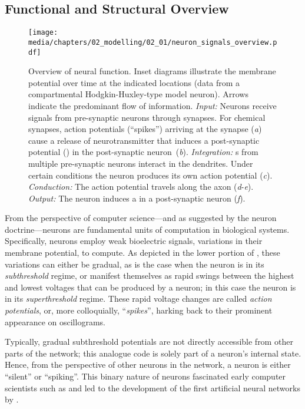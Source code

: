 \subsection{Functional and Structural Overview}
\label{sec:neurons_overview}

\begin{figure}
	\centering
	\texttt{[image: media/chapters/02\_modelling/02\_01/neuron\_signals\_overview.pdf]}
	\caption[Overview of neural function]{Overview of neural function. Inset diagrams illustrate the membrane potential over time at the indicated locations (data from a compartmental Hodgkin-Huxley-type model neuron). Arrows indicate the predominant flow of information. \emph{Input:} Neurons receive signals from pre-synaptic neurons through synapses. For chemical synapses, action potentials (\enquote{spikes}) arriving at the synapse (\emph{a}) cause a release of neurotransmitter that induces a post-synaptic potential (\PSP) in the post-synaptic neuron~(\emph{b}). \emph{Integration:} {\PSP}s from multiple pre-synaptic neurons interact in the dendrites. Under certain conditions the neuron produces its own action potential (\emph{c}). \emph{Conduction:} The action potential travels along the axon (\emph{d}-\emph{e}). \emph{Output:} The neuron induces a \PSP in a post-synaptic neuron (\emph{f}).
	}
	\label{fig:neuron_signal_overview}
\end{figure}

From the perspective of computer science---and as suggested by the neuron doctrine---neurons are fundamental units of computation in biological systems.
Specifically, neurons employ weak bioelectric signals, variations in their membrane potential, to compute.
As depicted in the lower portion of , these variations can either be gradual, as is the case when the neuron is in its \emph{subthreshold} regime, or manifest themselves as rapid swings between the highest and lowest voltages that can be produced by a neuron; in this case the neuron is in its \emph{superthreshold} regime.
These rapid voltage changes are called \emph{action potentials}, or, more colloquially, \enquote{\emph{spikes}}, harking back to their prominent appearance on oscillograms.

Typically, gradual subthreshold potentials are not directly accessible from other parts of the network;
this analogue code is solely part of a neuron's internal state.
Hence, from the perspective of other neurons in the network, a neuron is either \enquote{silent} or \enquote{spiking}.
This binary nature of neurons fascinated early computer scientists such as \citet{vonneumann1958computer} and led to the development of the first artificial neural networks by \citet{mcculloch1943logical}.

